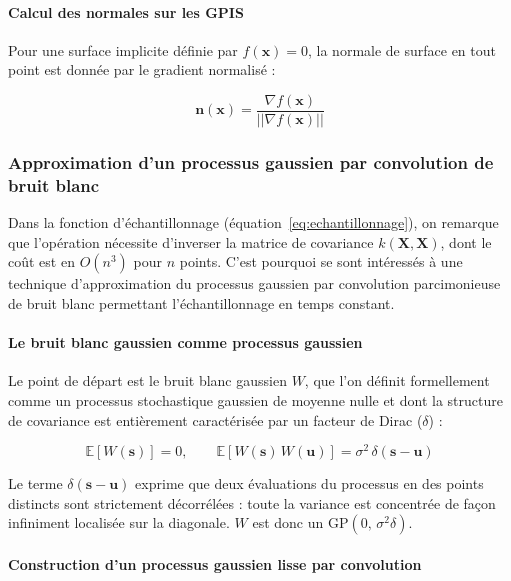 \paragraph{Calcul des normales sur les GPIS}

Pour une surface implicite définie par $f(\mathbf{x}) = 0$, la normale de surface en tout point est donnée par le gradient normalisé :

\begin{equation}
\mathbf{n}(\mathbf{x}) = \frac{\nabla f(\mathbf{x})}{||\nabla f(\mathbf{x})||}
\end{equation}


\subsubsection{Approximation d'un processus gaussien par convolution de bruit blanc}

Dans la fonction d'échantillonnage (équation~\ref{eq:echantillonnage}), on remarque que l'opération nécessite d'inverser la matrice de covariance $k(\mathbf{X}, \mathbf{X})$, dont le coût est en $O(n^3)$ pour $n$ points. C'est pourquoi \textcite{xu25practical} se sont intéressés à une technique d'approximation du processus gaussien par convolution parcimonieuse de bruit blanc permettant l'échantillonnage en temps constant. 

\paragraph{Le bruit blanc gaussien comme processus gaussien}

Le point de départ est le bruit blanc gaussien $W$, que l'on définit formellement comme un processus stochastique gaussien de moyenne nulle et dont la structure de covariance est entièrement caractérisée par un facteur de Dirac ($\delta$) :

\begin{equation}
\mathbb{E}[W(\mathbf{s})] = 0, \qquad \mathbb{E}[W(\mathbf{s})\, W(\mathbf{u})] = \sigma^2\, \delta(\mathbf{s} - \mathbf{u})
\end{equation}

Le terme $\delta(\mathbf{s} - \mathbf{u})$ exprime que deux évaluations du processus en des points distincts sont strictement décorrélées : toute la variance est concentrée de façon infiniment localisée sur la diagonale. $W$ est donc un $\text{GP}(0,\, \sigma^2 \delta)$.

\paragraph{Construction d'un processus gaussien lisse par convolution}

